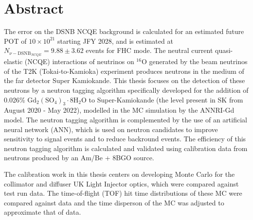 \chapter*{Abstract}
\thispagestyle{empty}

The error on the DSNB NCQE background is calculated for an estimated future POT of $10 \times 10^{21}$ starting JFY 2028, and is estimated at $N_{\nu-\mathrm{DSNB}_{NCQE}}= 9.88 \pm 3.62$ events for FHC mode. The neutral current quasi-elastic (NCQE) interactions of neutrinos on ${ }^{16} \mathrm{O}$ generated by the beam neutrinos of the T2K (Tokai-to-Kamioka) experiment produces neutrons in the medium of the far detector Super Kamiokande. This thesis focuses on the detection of these neutrons by a neutron tagging algorithm specifically developed for the addition of 0.026\% $\mathrm{Gd}_{2}\left(\mathrm{SO}_{4}\right)_{3} \cdot 8 \mathrm{H}_{2} \mathrm{O}$ to Super-Kamiokande (the level present in SK from August 2020 - May 2022), modelled in the MC simulation by the ANNRI-Gd model. The neutron tagging algorithm is complemented by the use of an artificial neural network (ANN), which is used on neutron candidates to improve sensitivity to signal events and to reduce backround events. The efficiency of this neutron tagging algorithm is calculated and validated using calibration data from neutrons produced by an Am/Be + 8BGO source.

The calibration work in this thesis centers on developing Monte Carlo for the collimator and diffuser UK Light Injector optics, which were compared against test run data. The time-of-flight (TOF) hit time distributions of these MC were compared against data and the time disperson of the MC was adjusted to approximate that of data.
